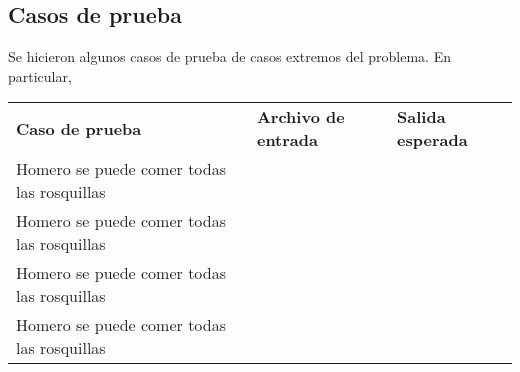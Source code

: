 

\newpage{}

\subsection{Casos de prueba}

Se hicieron algunos casos de prueba de casos extremos del problema. En particular,

\begin{tabularx}{\textwidth}{l l l}
\textbf{Caso de prueba} & \textbf{Archivo de entrada} & \textbf{Salida esperada} \\
Homero se puede comer todas las rosquillas &  &  \\
Homero se puede comer todas las rosquillas &  &  \\
Homero se puede comer todas las rosquillas &  &  \\
Homero se puede comer todas las rosquillas &  & 
\end{tabularx}
